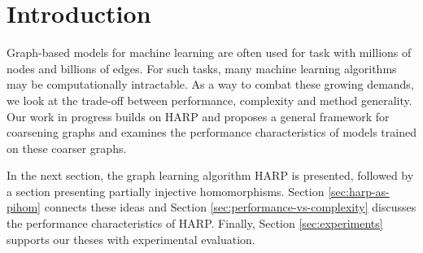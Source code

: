 \section{Introduction}

Graph-based models for machine learning are often used for task with millions of nodes and billions of edges. For such tasks, many machine learning algorithms may be computationally intractable. As a way to combat these growing demands, we look at the trade-off between performance, complexity and method generality. Our work in progress builds on HARP \cite{chen_harp_2018} and proposes a general framework for coarsening graphs and examines the performance characteristics of models trained on these coarser graphs.

In the next section, the graph learning algorithm HARP is presented, followed by a section presenting partially injective homomorphisms. Section \ref{sec:harp-as-pihom} connects these ideas and Section \ref{sec:performance-vs-complexity} discusses the performance characteristics of HARP. Finally, Section \ref{sec:experiments} supports our theses with experimental evaluation.
